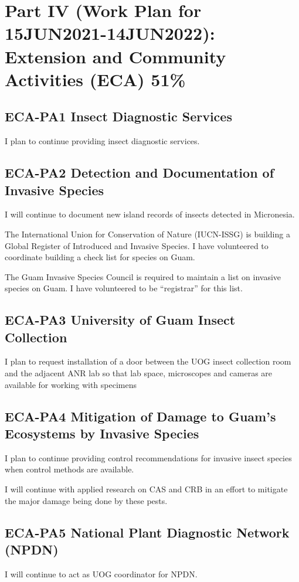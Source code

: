\newpage
\section{Part IV (Work Plan for 15JUN2021-14JUN2022): Extension and Community Activities (ECA) 51\%}

\subsection{ECA-PA1 Insect Diagnostic Services} 
I plan to continue providing insect diagnostic services.

\subsection{ECA-PA2 Detection and Documentation of Invasive Species} 
I will continue to document new island records of insects detected in Micronesia.

The International Union for Conservation of Nature (IUCN-ISSG) is
building a Global Register of Introduced and Invasive Species. I have
volunteered to coordinate building a check list for species on Guam.

The Guam Invasive Species Council is required to maintain a list on
invasive species on Guam. I have volunteered to be ``registrar''
for this list.

\subsection{ECA-PA3 University of Guam Insect Collection}
I plan to request installation of a door between the UOG insect collection room and the adjacent ANR lab so that lab space, microscopes and cameras are available for working with specimens 

\subsection{ECA-PA4 Mitigation of Damage to Guam's Ecosystems by Invasive Species} 
I plan to continue providing control recommendations for invasive insect species when control methods are available.

I will continue with applied research on CAS and CRB in an effort to mitigate the major damage being done by these pests.

\subsection{ECA-PA5 National Plant Diagnostic Network (NPDN)}
I will continue to act as UOG coordinator for NPDN.

